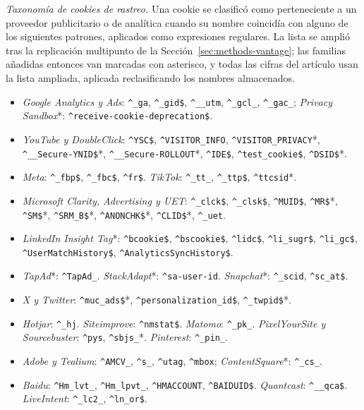\documentclass[pdflatex,sn-basic,Numbered]{sn-jnl}
\theoremstyle{thmstyleone}
\theoremstyle{thmstyletwo}
\theoremstyle{thmstylethree}
\begin{document}
\begin{appendices}
\emph{Taxonom\'ia de cookies de rastreo.} Una cookie se clasific\'o como perteneciente a un proveedor publicitario o de anal\'itica cuando su nombre coincid\'ia con alguno de los siguientes patrones, aplicados como expresiones regulares. La lista se ampli\'o tras la replicaci\'on multipunto de la Secci\'on~\ref{sec:methods-vantage}; las familias a\~nadidas entonces van marcadas con asterisco, y todas las cifras del art\'iculo usan la lista ampliada, aplicada reclasificando los nombres almacenados.

\begin{itemize}
	\item \emph{Google Analytics y Ads}: \verb|^_ga|, \verb|^_gid$|, \verb|^__utm|, \verb|^_gcl_|, \verb|^_gac_|; \emph{Privacy Sandbox}*: \verb|^receive-cookie-deprecation$|.
	\item \emph{YouTube y DoubleClick}: \verb|^YSC$|, \verb|^VISITOR_INFO|, \verb|^VISITOR_PRIVACY|*, \verb|^__Secure-YNID$|*, \verb|^__Secure-ROLLOUT|*, \verb|^IDE$|, \verb|^test_cookie$|, \verb|^DSID$|*.
	\item \emph{Meta}: \verb|^_fbp$|, \verb|^_fbc$|, \verb|^fr$|. \emph{TikTok}: \verb|^_tt_|, \verb|^_ttp$|, \verb|^ttcsid|*.
	\item \emph{Microsoft Clarity, Advertising y UET}: \verb|^_clck$|, \verb|^_clsk$|, \verb|^MUID$|, \verb|^MR$|*, \verb|^SM$|*, \verb|^SRM_B$|*, \verb|^ANONCHK$|*, \verb|^CLID$|*, \verb|^_uet|.
	\item \emph{LinkedIn Insight Tag}*: \verb|^bcookie$|, \verb|^bscookie$|, \verb|^lidc$|, \verb|^li_sugr$|, \verb|^li_gc$|, \verb|^UserMatchHistory$|, \verb|^AnalyticsSyncHistory$|.
	\item \emph{TapAd}*: \verb|^TapAd_|. \emph{StackAdapt}*: \verb|^sa-user-id|. \emph{Snapchat}*: \verb|^_scid|, \verb|^sc_at$|.
	\item \emph{X y Twitter}: \verb|^muc_ads$|*, \verb|^personalization_id$|, \verb|^_twpid$|*.
	\item \emph{Hotjar}: \verb|^_hj|. \emph{Siteimprove}: \verb|^nmstat$|. \emph{Matomo}: \verb|^_pk_|. \emph{PixelYourSite y Sourcebuster}: \verb|^pys|, \verb|^sbjs_|*. \emph{Pinterest}: \verb|^_pin_|.
	\item \emph{Adobe y Tealium}: \verb|^AMCV_|, \verb|^s_|, \verb|^utag|, \verb|^mbox|; \emph{ContentSquare}*: \verb|^_cs_|.
	\item \emph{Baidu}: \verb|^Hm_lvt_|, \verb|^Hm_lpvt_|, \verb|^HMACCOUNT|, \verb|^BAIDUID$|. \emph{Quantcast}: \verb|^__qca$|. \emph{LiveIntent}: \verb|^_lc2_|, \verb|^ln_or$|.
\end{itemize}


\end{appendices}
\end{document}
